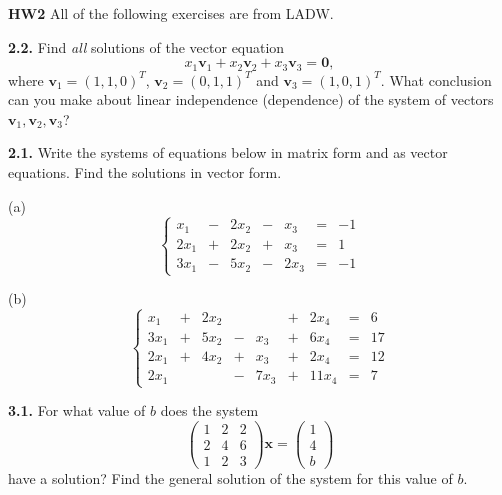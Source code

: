 \documentclass{article}
\begin{document}

\textbf{HW2}
All of the following exercises are from LADW.

\textbf{2.2.} Find \textit{all} solutions of the vector equation
$$
x_1\mathbf{v}_1 + x_2\mathbf{v}_2 + x_3\mathbf{v}_3 = \mathbf{0},
$$
where $\mathbf{v}_1 = (1, 1, 0)^T$, $\mathbf{v}_2 = (0, 1, 1)^T$ and $\mathbf{v}_3 = (1, 0, 1)^T$. What conclusion can you make about linear independence (dependence) of the system of vectors $\mathbf{v}_1, \mathbf{v}_2, \mathbf{v}_3$?

\textbf{2.1.} Write the systems of equations below in matrix form and as vector equations. Find the solutions in vector form.


(a) 
\[\left\{\begin{array}{rcrcrcr}
     x_1 & - & 2x_2 & - &  x_3 & = & -1 \\
    2x_1 & + & 2x_2 & + &  x_3 & = & 1 \\
    3x_1 & - & 5x_2 & -  &  2x_3    & = & -1 
\end{array}
\right.\]



(b) 
\[
\left\{
\begin{array}{rcrcrcrcr}
     x_1 & + & 2x_2 &   &      & + &  2x_4 & = & 6 \\
    3x_1 & + & 5x_2 & - &  x_3 & + &  6x_4 & = & 17 \\
    2x_1 & + & 4x_2 & + &  x_3 & + &  2x_4 & = & 12 \\
    2x_1 &   &      & - & 7x_3 & + & 11x_4 & = & 7
\end{array}
\right.
\]

\textbf{3.1.} For what value of $b$ does the system
$$
\begin{pmatrix} 1 & 2 & 2 \\ 2 & 4 & 6 \\ 1 & 2 & 3 \end{pmatrix} \mathbf{x} = \begin{pmatrix} 1 \\ 4 \\ b \end{pmatrix}
$$
have a solution? Find the general solution of the system for this value of $b$.
\end{document}
